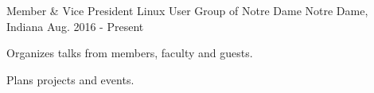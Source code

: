 \begin{cventries}
  \cventry
    {Member \& Vice President}
    {Linux User Group of Notre Dame}
    {Notre Dame, Indiana}
    {Aug. 2016 - Present}
    {
      \begin{cvitems}
        \item {Organizes talks from members, faculty and guests.}
        \item {Plans projects and events.}
      \end{cvitems}
    }
\end{cventries}
